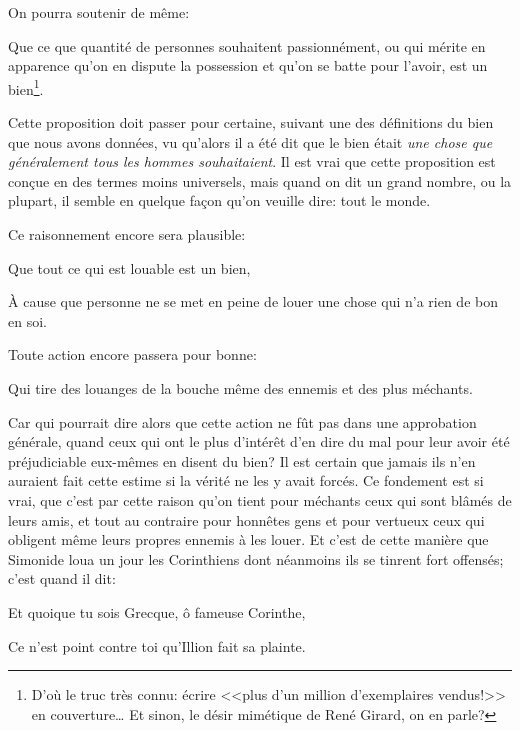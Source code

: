 \bigbreak

On pourra soutenir de même:

\begin{emphpar}
	   Que ce que quantité de personnes souhaitent passionnément, ou qui mérite en apparence qu'on en dispute la
	   possession et qu'on se batte pour l'avoir, est un bien\footnote{D'où le truc très connu: écrire <<plus d'un
	   million d'exemplaires vendus!>> en couverture\dots{} Et sinon, le désir mimétique de René Girard, on en
	   parle?}.
\end{emphpar}

Cette proposition doit passer pour certaine, suivant une des définitions du bien que nous avons données, vu qu'alors
il a été dit que le bien était \emph{une chose que généralement tous les hommes souhaitaient}. Il est vrai que cette
proposition est conçue en des termes moins universels, mais quand on dit un grand nombre, ou la plupart, il semble en
quelque façon qu'on veuille dire: tout le monde.

\bigbreak

Ce raisonnement encore sera plausible:

\begin{emphpar}
	   Que tout ce qui est louable est un bien,
\end{emphpar}

À cause que personne ne se met en peine de louer une chose qui n'a rien de bon en soi. 

\bigbreak

Toute action encore passera pour bonne:

\begin{emphpar}
	   Qui tire des louanges de la bouche même des ennemis et des plus méchants.
\end{emphpar}

Car qui pourrait dire alors que cette action ne fût pas dans une approbation générale, quand ceux qui ont le plus d'intérêt
d'en dire du mal pour leur avoir été préjudiciable eux-mêmes en disent du bien? Il est certain que jamais ils n'en auraient
fait cette estime si la vérité ne les y avait forcés. Ce fondement est si vrai, que c'est par cette raison qu'on tient pour
méchants ceux qui sont blâmés de leurs amis, et tout au contraire pour honnêtes gens et pour vertueux ceux qui obligent même
leurs propres ennemis à les louer. Et c'est de cette manière que Simonide loua un jour les Corinthiens dont néanmoins ils se
tinrent fort offensés; c'est quand il dit:

\begin{emphpar}
	   Et quoique tu sois Grecque, ô fameuse Corinthe,
	   
	   Ce n'est point contre toi qu'Illion fait sa plainte.
\end{emphpar}

